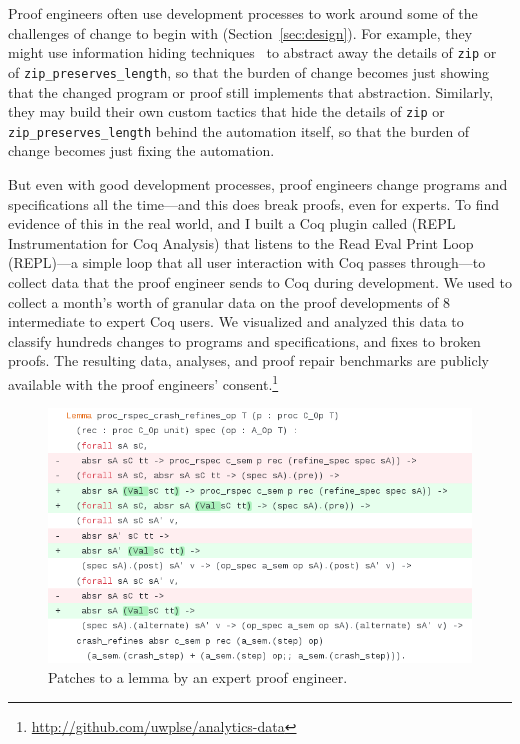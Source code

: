 Proof engineers often use development processes to work around some of the challenges of change to begin with (Section~\ref{sec:design}).
For example, they might use information hiding techniques~\cite{Woos:2016:PCF:2854065.2854081, Klein:2014:CFV:2584468.2560537}
to abstract away the details of \lstinline{zip} or of \lstinline{zip_preserves_length},
so that the burden of change becomes just showing that the changed program or proof still implements that abstraction.
Similarly, they may build their own custom tactics that hide the details of
\lstinline{zip} or \lstinline{zip_preserves_length} behind the automation itself,
so that the burden of change becomes just fixing the automation.
 
But even with good development processes, proof engineers change programs and specifications all the time---and this does break proofs, 
even for experts.
To find evidence of this in the real world,  and I built a Coq plugin called \toolname 
(REPL Instrumentation for Coq Analysis) that listens to the Read Eval Print
Loop (REPL)---a simple loop that all user interaction with Coq passes through---to collect data that the proof engineer sends to Coq during development.
We used \toolname to collect a month's worth of granular data on 
the proof developments of 8 intermediate to expert Coq users.
We visualized and analyzed this data to classify hundreds changes to programs and specifications,
and fixes to broken proofs.
The resulting data, analyses, and proof repair benchmarks are publicly available with the proof engineers' 
consent.\footnote{\url{http://github.com/uwplse/analytics-data}}

\begin{figure}
  \includegraphics[width=1.0\textwidth]{maintenance/fig/patch.png}
  \caption{Patches to a lemma by an expert proof engineer.}
  \label{fig:patch}
\end{figure}

